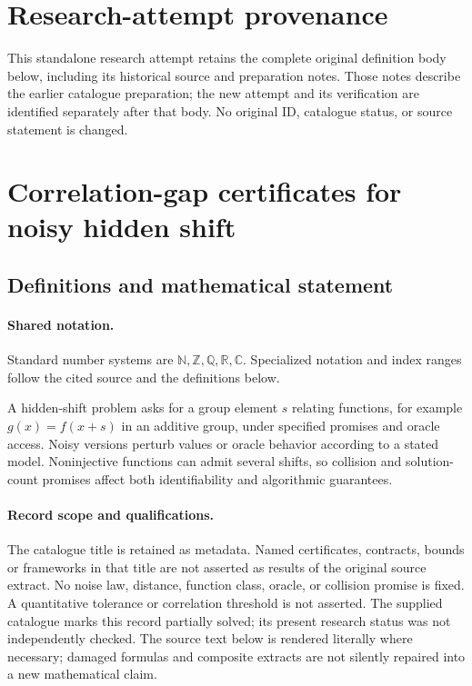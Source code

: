 \documentclass[11pt]{article}
\begin{document}
\section*{Research-attempt provenance}
This standalone research attempt retains the complete original definition body below,
including its historical source and preparation notes. Those notes describe the
earlier catalogue preparation; the new attempt and its verification are identified
separately after that body. No original ID, catalogue status, or source statement is changed.

\section{Correlation-gap certificates for noisy hidden shift}\label{statement}

\subsection{Definitions and mathematical statement}

\paragraph{Shared notation.}Standard number systems are $\mathbb N,\mathbb Z,\mathbb Q,\mathbb R,\mathbb C$. Specialized notation and index ranges follow the cited source and the definitions below.


A hidden-shift problem asks for a group element $s$ relating functions, for example $g(x)=f(x+s)$ in an additive group, under specified promises and oracle access. Noisy versions perturb values or oracle behavior according to a stated model. Noninjective functions can admit several shifts, so collision and solution-count promises affect both identifiability and algorithmic guarantees.
\paragraph{Record scope and qualifications.}
The catalogue title is retained as metadata. Named certificates, contracts, bounds or frameworks in that title are not asserted as results of the original source extract.
No noise law, distance, function class, oracle, or collision promise is fixed. A quantitative tolerance or correlation threshold is not asserted. The supplied catalogue marks this record partially solved; its present research status was not independently checked.
The source text below is rendered literally where necessary; damaged formulas and composite extracts are not silently repaired into a new mathematical claim.
\end{document}
